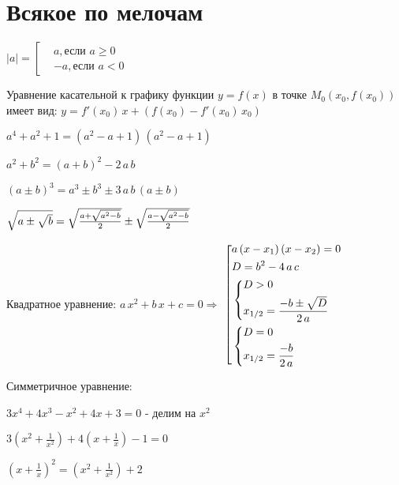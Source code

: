 ﻿\section{Всякое по мелочам}

$ |a| = \left[ \begin{aligned}
	& a,\text{если\ } a\ge 0 \\
	& -a,\text{если\ } a < 0
\end{aligned}\right. $

\begin{center}
	Уравнение касательной к графику функции $\displaystyle y = f(x) $ в точке $\displaystyle M_0(x_0, f(x_0)) $ имеет вид:
	$ y = f'(x_0)\, x + (f(x_0) - f'(x_0)\, x_0) $
\end{center}

$ a^4 + a^2 + 1 = (a^2 - a + 1)\, (a^2 - a + 1) $

$ a^2 + b^2 = (a + b)^2 - 2\, a\, b $

$ (a \pm b)^3 = a^3\pm b^3\pm 3\, a\, b\, (a\pm b) $

$ \sqrt{\mathstrut a\pm \sqrt{\mathstrut b}} = \sqrt{\mathstrut \frac{a + \sqrt{\mathstrut a^2 - b}}{2}}\pm \sqrt{\mathstrut \frac{a - \sqrt{\mathstrut a^2 - b}}{2}} $

\begin{center}
	Квадратное уравнение:
	$ a\, x^2 + b\, x + c = 0 \Rightarrow $ $ \left[ \begin{aligned}
		& a\, (x - x_1)\, (x - x_2) = 0 \\
		& D = b^2 - 4\, a\, c \\
		& \left\{ \begin{aligned}
			& D > 0 \\
			& x_{1/2} = \frac{-b\pm \sqrt{\mathstrut D}}{2\, a}
		\end{aligned}\right. \\
		& \left\{ \begin{aligned}
			& D = 0 \\
			& x_{1/2} = \frac{-b}{2\, a}
		\end{aligned}\right.
	\end{aligned}\right. $
\end{center}

Симметричное уравнение:

$ 3x^4 + 4x^3 - x^2 + 4x + 3 = 0 $ - делим на $x^2$

$ 3\left(x^2 + \frac{1}{x^2}\right) + 4\left(x+\frac{1}{x}\right)-1 = 0 $

$ \left(x+\frac{1}{x}\right)^2 = \left(x^2+\frac{1}{x^2}\right) + 2 $

